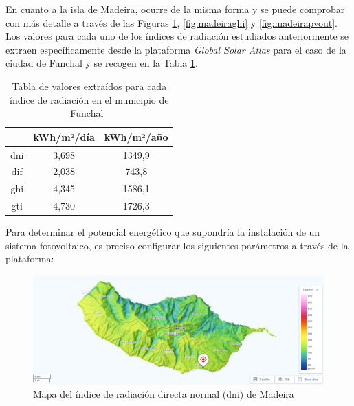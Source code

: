 \vspace{3mm}

En cuanto a la isla de Madeira, ocurre de la misma forma y se puede comprobar con más detalle a través de las Figuras \ref{fig:madeiradni}, \ref{fig:madeiraghi} y \ref{fig:madeirapvout}. Los valores para cada uno de los índices de radiación estudiados anteriormente se extraen específicamente desde la plataforma \textit{Global Solar Atlas} para el caso de la ciudad de Funchal y se recogen en la Tabla \ref{tab:global}.

\begin{table}[h!]
    \centering
    \begin{tabular}{|c|c|c|}
    \hline
    \rowcolor[HTML]{AAAAAA} 
    \multicolumn{1}{|c|}{\cellcolor[HTML]{AAAAAA}Parámetro} & \multicolumn{1}{c|}{\cellcolor[HTML]{AAAAAA}kWh/m²/día} & kWh/m²/año \\ \hline
    \gls{dni} & 3,698 & 1349,9 \\ \hline
    \gls{dif} & 2,038 & 743,8 \\ \hline
    \gls{ghi} & 4,345 & 1586,1 \\ \hline
    \gls{gti} & 4,730 & 1726,3 \\ \hline
    \end{tabular}
    \caption{Tabla de valores extraídos para cada índice de radiación en el municipio de Funchal~\cite{globalsolar}}
    \label{tab:global}
\end{table}





Para determinar el potencial energético que supondría la instalación de un sistema fotovoltaico, es preciso configurar los siguientes parámetros a través de la plataforma:





\begin{figure}[H]
    \centering
    \includegraphics[width=1\textwidth]{img/diseno/madeiradni.png}
    \caption{Mapa del índice de radiación directa normal (\acrshort{dni}) de Madeira \cite{globalsolar}}
    \label{fig:madeiradni}
\end{figure}

